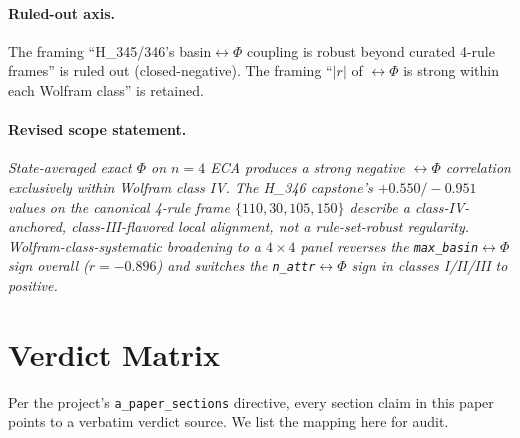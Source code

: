 \documentclass[11pt,a4paper]{article}
\newcommand{\bigphi}{\ensuremath{\Phi}}
\newcommand{\verdictref}[1]{\texttt{\detokenize{#1}}}
\begin{document}
\paragraph{Ruled-out axis.}
The framing ``H\_345/346's basin$\leftrightarrow$\bigphi{} coupling is
robust beyond curated 4-rule frames'' is ruled out (closed-negative).
The framing ``$|r|$ of \verdictref{n_attr}$\leftrightarrow$\bigphi{} is
strong within each Wolfram class'' is retained.

\paragraph{Revised scope statement.}
\emph{State-averaged exact \bigphi{} on $n=4$ ECA produces a strong
negative \verdictref{n_attr}$\leftrightarrow$\bigphi{} correlation
exclusively within Wolfram class IV. The H\_346 capstone's
$+0.550/-0.951$ values on the canonical 4-rule frame
$\{110, 30, 105, 150\}$ describe a class-IV-anchored, class-III-flavored
local alignment, not a rule-set-robust regularity. Wolfram-class-systematic
broadening to a $4 \times 4$ panel reverses the
\texttt{max\_basin}$\leftrightarrow$\bigphi{} sign overall ($r=-0.896$)
and switches the \texttt{n\_attr}$\leftrightarrow$\bigphi{} sign in
classes I/II/III to positive.}

\section{Verdict Matrix}
\label{sec:verdict}

Per the project's \texttt{a\_paper\_sections} directive, every section
claim in this paper points to a verbatim verdict source. We list the
mapping here for audit.
\end{document}
